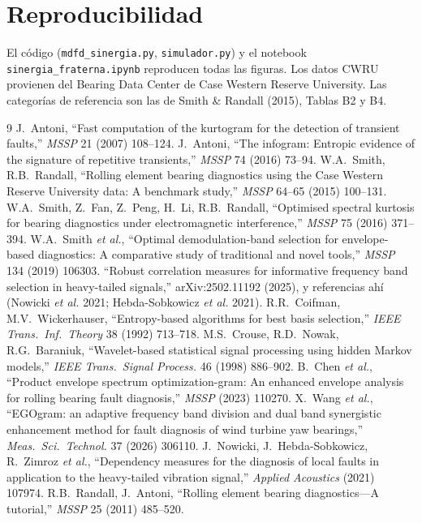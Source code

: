 \documentclass[11pt,a4paper]{article}
\theoremstyle{definition}
\theoremstyle{remark}
\begin{document}
\section*{Reproducibilidad}
El código (\texttt{mdfd\_sinergia.py}, \texttt{simulador.py}) y el notebook \texttt{sinergia\_fraterna.ipynb} reproducen todas las figuras. Los datos CWRU provienen del Bearing Data Center de Case Western Reserve University. Las categorías de referencia son las de Smith \& Randall (2015), Tablas B2 y B4.

\begin{thebibliography}{9}\small
{} J.~Antoni, ``Fast computation of the kurtogram for the detection of transient faults,'' \emph{MSSP} 21 (2007) 108--124.
 J.~Antoni, ``The infogram: Entropic evidence of the signature of repetitive transients,'' \emph{MSSP} 74 (2016) 73--94.
 W.A.~Smith, R.B.~Randall, ``Rolling element bearing diagnostics using the Case Western Reserve University data: A benchmark study,'' \emph{MSSP} 64--65 (2015) 100--131.
 W.A.~Smith, Z.~Fan, Z.~Peng, H.~Li, R.B.~Randall, ``Optimised spectral kurtosis for bearing diagnostics under electromagnetic interference,'' \emph{MSSP} 75 (2016) 371--394.
 W.A.~Smith \emph{et al.}, ``Optimal demodulation-band selection for envelope-based diagnostics: A comparative study of traditional and novel tools,'' \emph{MSSP} 134 (2019) 106303.
 ``Robust correlation measures for informative frequency band selection in heavy-tailed signals,'' arXiv:2502.11192 (2025), y referencias ahí (Nowicki \emph{et al.} 2021; Hebda-Sobkowicz \emph{et al.} 2021).
 R.R.~Coifman, M.V.~Wickerhauser, ``Entropy-based algorithms for best basis selection,'' \emph{IEEE Trans.\ Inf.\ Theory} 38 (1992) 713--718.
 M.S.~Crouse, R.D.~Nowak, R.G.~Baraniuk, ``Wavelet-based statistical signal processing using hidden Markov models,'' \emph{IEEE Trans.\ Signal Process.} 46 (1998) 886--902.
 B.~Chen \emph{et al.}, ``Product envelope spectrum optimization-gram: An enhanced envelope analysis for rolling bearing fault diagnosis,'' \emph{MSSP} (2023) 110270.
 X.~Wang \emph{et al.}, ``EGOgram: an adaptive frequency band division and dual band synergistic enhancement method for fault diagnosis of wind turbine yaw bearings,'' \emph{Meas.\ Sci.\ Technol.} 37 (2026) 306110.
 J.~Nowicki, J.~Hebda-Sobkowicz, R.~Zimroz \emph{et al.}, ``Dependency measures for the diagnosis of local faults in application to the heavy-tailed vibration signal,'' \emph{Applied Acoustics} (2021) 107974.
 R.B.~Randall, J.~Antoni, ``Rolling element bearing diagnostics---A tutorial,'' \emph{MSSP} 25 (2011) 485--520.
\end{thebibliography}
\end{document}
